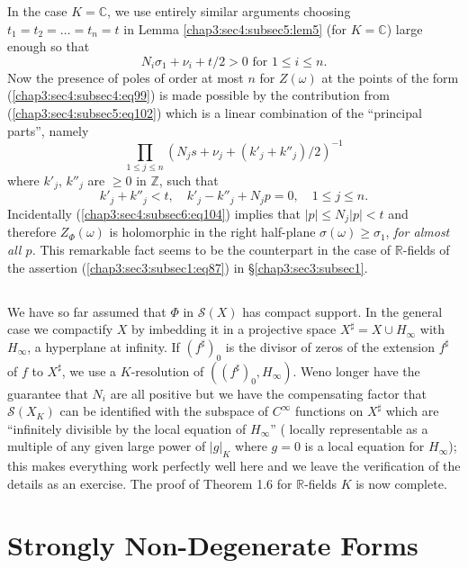 In the case $K=\mathbb{C}$, we use entirely similar arguments choosing
$t_{1}=t_{2}=\ldots=t_{n}=t$ in Lemma \ref{chap3:sec4:subsec5:lem5} (for
$K=\mathbb{C}$) large enough so that
$$
N_{i}\sigma_{1}+\nu_{i}+t/2>0\text{ \ for \ } 1\leq i\leq n.
$$
Now the presence of poles of order at most $n$ for $Z(\omega)$ at the
points of the form (\ref{chap3:sec4:subsec4:eq99}) is made possible by
the contribution 
from (\ref{chap3:sec4:subsec5:eq102}) which is a linear combination of the ``principal
parts'', namely
$$
\prod_{1\leq j\leq n}(N_{j}s+\nu_{j}+(k'_{j}+k''_{j})/2)^{-1}
$$
where $k'_{j}$, $k''_{j}$ are $\geq 0$ in $\mathbb{Z}$, such that
\begin{equation*}
  k'_{j}+k''_{j}<t,\quad k'_{j}-k''_{j}+N_{j}p=0,\quad 1\leq j\leq
  n.\tag{104}\label{chap3:sec4:subsec6:eq104}
\end{equation*}
Incidentally (\ref{chap3:sec4:subsec6:eq104}) implies that $|p|\leq N_{j}|p|<t$ and
therefore $Z_{\Phi}(\omega)$ is holomorphic in the right half-plane
$\sigma(\omega)\geq \sigma_{1}$, {\em for almost all $p$.} This
remarkable fact seems to be the counterpart in the case of
$\mathbb{R}$-fields of the assertion (\ref{chap3:sec3:subsec1:eq87}) in
\S \ref{chap3:sec3:subsec1}. 

\subsection{}\label{chap3:sec4:subsec7}%

We have so far assumed that $\Phi$ in $\mathscr{S}(X)$ has compact
support. In the general case we compactify $X$ by imbedding it in a
projective space $X^{\sharp}=X\cup H_{\infty}$ with $H_{\infty}$, a
hyperplane at infinity. If $(f^{\sharp})_{0}$ is the divisor of zeros
of the extension $f^{\sharp}$ of $f$ to $X^{\sharp}$, we use a
$K$-resolution of $((f^{\sharp})_{0},H_{\infty})$. We\pageoriginale no
longer have the guarantee that $N_{i}$ are all positive but we have
the compensating factor that $\mathscr{S}(X_{K})$ can be identified with
the subspace of $C^{\infty}$ functions on $X^{\sharp}$ which are
``infinitely divisible by the local equation of $H_{\infty}$'' (\ie
locally representable as a multiple of any given large power of
$|g|_{K}$ where $g=0$ is a local equation for $H_{\infty}$); this
makes everything work perfectly well here and we leave the
verification of the details as an exercise. The proof of Theorem 1.6
for $\mathbb{R}$-fields $K$ is now complete. 

\section{Strongly Non-Degenerate Forms}\label{chap3:sec5} %

